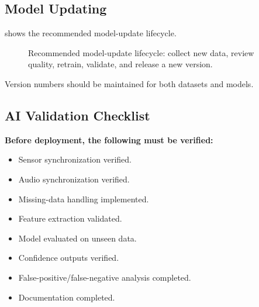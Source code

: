 \subsection{Model Updating}
\label{sec:model-updating}

 shows the recommended model-update lifecycle.

\begin{figure}[H]
\centering
{}
\caption{Recommended model-update lifecycle: collect new data, review quality, retrain, validate, and release a new version.}
\label{fig:model-updating}
\end{figure}

\begin{designnote}
Version numbers should be maintained for both datasets and models.
\end{designnote}

\subsection{AI Validation Checklist}
\label{sec:ai-validation-checklist}

\begin{requirementbox}
\textbf{Before deployment, the following must be verified:}
\begin{itemize}
    \item Sensor synchronization verified.
    \item Audio synchronization verified.
    \item Missing-data handling implemented.
    \item Feature extraction validated.
    \item Model evaluated on unseen data.
    \item Confidence outputs verified.
    \item False-positive/false-negative analysis completed.
    \item Documentation completed.
\end{itemize}
\end{requirementbox}

